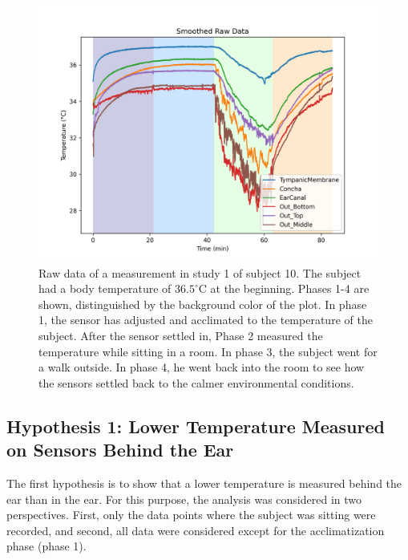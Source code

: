 \begin{figure}[!h]
    \centering
    \includegraphics[width=\textwidth]{thesis-doc/images/study1/Logging_person_10_0smoothed_raw_data.png}
    \caption{Raw data of a measurement in study 1 of subject 10. The subject had a body temperature of $36.5^\circ\text{C}$ at the beginning. Phases 1-4 are shown, distinguished by the background color of the plot. In phase 1, the sensor has adjusted and acclimated to the temperature of the subject. After the sensor settled in, Phase 2 measured the temperature while sitting in a room. In phase 3, the subject went for a walk outside. In phase 4, he went back into the room to see how the sensors settled back to the calmer environmental conditions.}
    \label{fig:ch:Evaluation:Study1:RawData}
\end{figure}

\subsection{Hypothesis 1: Lower Temperature Measured on Sensors Behind the Ear}
\label{subsec:Evaluation:Study1:Hypothesis1}

The first hypothesis is to show that a lower temperature is measured behind the ear than in the ear.
For this purpose, the analysis was considered in two perspectives. 
First, only the data points where the subject was sitting were recorded, and second, all data were considered except for the acclimatization phase (phase 1).

